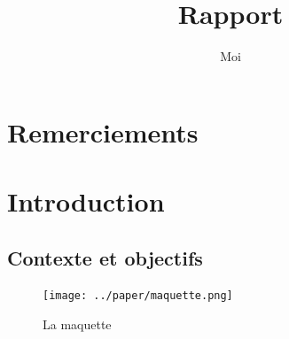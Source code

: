 \documentclass[oneside, a4paper, 11pt]{book}
\title{Rapport}
\author{Moi}
\begin{document}
\titleformat{\chapter}[display]
	{\normalfont\bfseries}{}{1em}{\Large\hspace{1em}}

\frontmatter
\maketitle

\chapter*{Remerciements}

\renewcommand{\contentsname}{Sommaire}
\tableofcontents

\mainmatter

\titleformat{\chapter}[display]
	{\normalfont\bfseries}{}{1em}{\Large\thechapter\hspace{1em}}

\chapter{Introduction}
\label{sec:intro}

\section{Contexte et objectifs}

\begin{figure}
	\begin{minipage}{0.28\textwidth}
		\centering
		\vspace{-0mm}
		\texttt{[image: ../paper/maquette.png]}
		\caption{La maquette}
		\label{fig:maquette}
	\end{minipage}
\end{figure}
\end{document}
